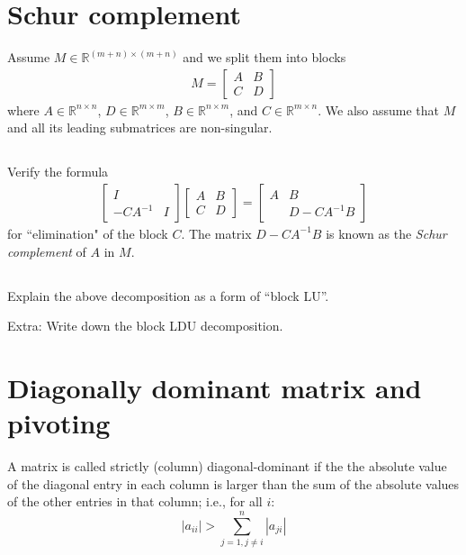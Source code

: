 \documentclass[11pt,letterpaper]{report}
\begin{document}
\section{Schur complement}
Assume $M\in \mathbb{R}^{(m+n)\times(m+n)}$ and we split them into blocks
\begin{align*}
    M = \begin{bmatrix}
    A &B\\
    C &D
    \end{bmatrix}
\end{align*}
where $A\in\mathbb{R}^{n\times n}$, $D\in\mathbb{R}^{m\times m}$, $B\in\mathbb{R}^{n\times m}$, and $C\in\mathbb{R}^{m\times n}$. We also assume that $M$ and all its leading submatrices are non-singular. 

\subsection{}
Verify the formula
\begin{align*}
     \begin{bmatrix}
    I & \\
    -CA^{-1} & I
    \end{bmatrix} \begin{bmatrix}
    A &B\\
    C &D
    \end{bmatrix} =  \begin{bmatrix}
    A &B\\
     &D-CA^{-1}B
    \end{bmatrix}
\end{align*}
for ``elimination" of the block $C$. The matrix $D-CA^{-1}B$ is  known as the \textit{Schur complement} of $A$ in $M$.

\subsection{}
Explain the above decomposition as a form of ``block LU''. 

Extra: Write down the block LDU decomposition. 

\section{Diagonally dominant matrix and pivoting}
A matrix is called strictly (column) diagonal-dominant if the
 the absolute value of the diagonal entry in each column is larger than
 the sum of the absolute values of the other entries in that
 column; i.e., for all $i$:
 $$
 |a_{ii}|>\sum_{j=1, j\not=i}^n |a_{ji}|
 $$
 
\end{document}
